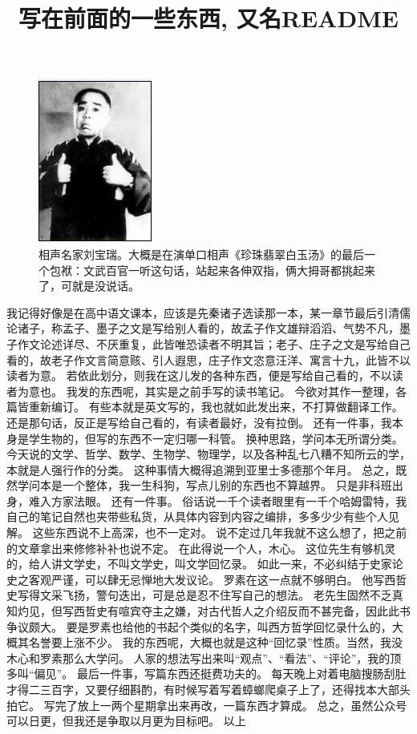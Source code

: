\documentclass{article}
\title{写在前面的一些东西, 又名README}
\begin{document}
\maketitle

\begin{figure}
  \centering
  \includegraphics{Figures/刘宝瑞.jpg}
  \caption{相声名家刘宝瑞。大概是在演单口相声《珍珠翡翠白玉汤》的最后一个包袱：文武百官一听这句话，站起来各伸双指，俩大拇哥都挑起来了，可就是没说话。}
\end{figure}
  
  \newpage
  \linenumbers

我记得好像是在高中语文课本，应该是先秦诸子选读那一本，某一章节最后引清儒论诸子，称孟子、墨子之文是写给别人看的，故孟子作文雄辩滔滔、气势不凡，墨子作文论述详尽、不厌重复，此皆唯恐读者不明其旨；老子、庄子之文是写给自己看的，故老子作文言简意赅、引人遐思，庄子作文恣意汪洋、寓言十九，此皆不以读者为意。
若依此划分，则我在这儿发的各种东西，便是写给自己看的，不以读者为意也。
\newline
我发的东西呢，其实是之前手写的读书笔记。
今欲对其作一整理，各篇皆重新编订。
有些本就是英文写的，我也就如此发出来，不打算做翻译工作。
还是那句话，反正是写给自己看的，有读者最好，没有拉倒。
\newline
还有一件事，我本身是学生物的，但写的东西不一定归哪一科管。
换种思路，学问本无所谓分类。
今天说的文学、哲学、数学、生物学、物理学，以及各种乱七八糟不知所云的学，本就是人强行作的分类。
这种事情大概得追溯到亚里士多德那个年月。
总之，既然学问本是一个整体，我一生科狗，写点儿别的东西也不算越界。
只是非科班出身，难入方家法眼。
\newline
还有一件事。
俗话说一千个读者眼里有一千个哈姆雷特，我自己的笔记自然也夹带些私货，从具体内容到内容之编排，多多少少有些个人见解。
这些东西说不上高深，也不一定对。
说不定过几年我就不这么想了，把之前的文章拿出来修修补补也说不定。
在此得说一个人，木心。
这位先生有够机灵的，给人讲文学史，不叫文学史，叫文学回忆录。
如此一来，不必纠结于史家论史之客观严谨，可以肆无忌惮地大发议论。
罗素在这一点就不够明白。
他写西哲史写得文采飞扬，警句迭出，可是总是忍不住写自己的想法。
老先生固然不乏真知灼见，但写西哲史有喧宾夺主之嫌，对古代哲人之介绍反而不甚完备，因此此书争议颇大。
要是罗素也给他的书起个类似的名字，叫西方哲学回忆录什么的，大概其名誉要上涨不少。
我的东西呢，大概也就是这种“回忆录”性质。当然，我没木心和罗素那么大学问。
人家的想法写出来叫“观点”、“看法”、“评论”，我的顶多叫“偏见”。
\newline
最后一件事，写篇东西还挺费功夫的。
每天晚上对着电脑搜肠刮肚才得二三百字，又要仔细斟酌，有时候写着写着蟑螂爬桌子上了，还得找本大部头拍它。
写完了放上一两个星期拿出来再改，一篇东西才算成。
总之，虽然公众号可以日更，但我还是争取以月更为目标吧。
\newline
以上    
\end{document}
